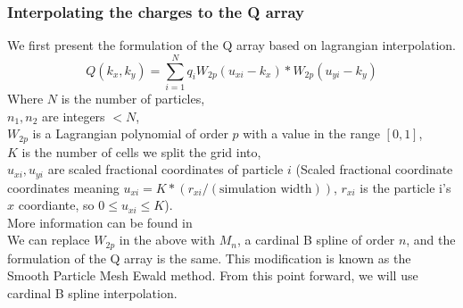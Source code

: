 \documentclass[pdftex,twoside,a4paper]{report}
\newcommand{\pmem}{Particle Mesh Ewald method}
\begin{document}
\subsubsection{Interpolating the charges to the Q array}
\label{sec:math_desc_lagrange}
We first present the formulation of the Q array based on lagrangian interpolation. 
\begin{equation} \label{eq:q_array}
Q(k_x,k_y) = \sum_{i=1} ^N q_i W_{2p}(u_{xi} - k_x) * W_{2p}(u_{yi} - k_y)
\end{equation}
Where $N$ is the number of particles,\\
$n_1,n_2$ are integers $< N$,\\
$W_{2p}$ is a Lagrangian polynomial of order $p$ with a value in the range $[0,1]$,\\
$K$ is the number of cells we split the grid into,\\
$u_{xi}, u_{yi}$ are scaled fractional coordinates of particle $i$ (Scaled fractional coordinate coordinates meaning $u_{xi} = K * (r_{xi} / (\text{simulation width}))$, $r_{xi}$ is the particle i's $x$ coordiante, so $0 \leq u_{xi} \leq K$).\\
More information can be found in \cite{essmann:8577}\\

We can replace $W_{2p}$ in the above with $M_n$, a cardinal B spline of order $n$, and the formulation of the Q array is the same. This modification is known as the Smooth \pmem{}. From this point forward, we will use cardinal B spline interpolation.
\end{document}
